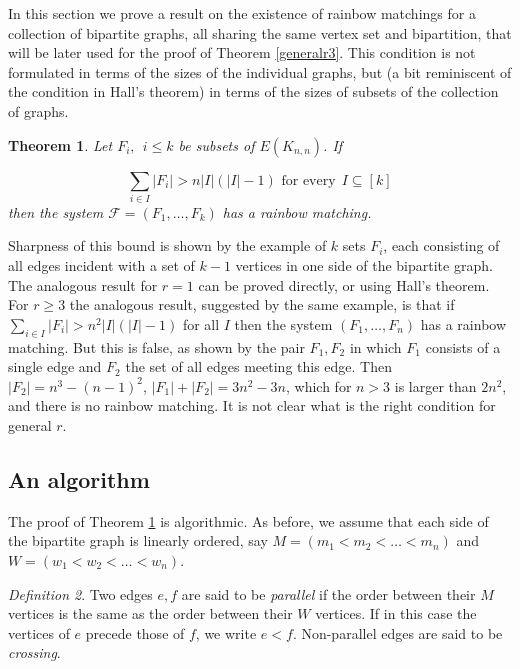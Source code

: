 \documentclass{amsart}
\newtheorem{theorem}{Theorem}[section]
\theoremstyle{remark}
\newtheorem{definition}[theorem]{Definition}
\newcommand{\cf}{\mathcal F}
\begin{document}
In this section we prove a result on the existence of rainbow
matchings for a collection of bipartite graphs, all sharing the same
vertex set and bipartition, that will be later used for the proof of
Theorem \ref{generalr3}. This condition is not formulated in terms
of the sizes of the individual graphs, but (a bit reminiscent of the
condition in Hall's theorem) in terms of the sizes of subsets of the
collection of graphs.

\begin{theorem}\label{maintheorem}
Let  $F_i,~~i \le k$ be subsets of $E(K_{n,n})$.
 If

 \begin{equation}\label{condition}
 \sum_{i \in I}|F_i| > n|I|(|I|-1) \mbox{ for every} ~~I \subseteq [k]
 \end{equation}
 then the system $\cf=(F_1, \ldots ,F_k)$ has  a rainbow matching.
  \end{theorem}


Sharpness of this bound is shown by the example of $k$ sets $F_i$,
 each consisting of all edges incident with a set  of $k-1$ vertices in one side of the bipartite graph.
The analogous result for $r=1$ can be proved directly, or using
Hall's theorem. For $r \ge 3$ the analogous result,
suggested by the same example, is that if
$\sum_{i \in I}|F_i| > n^2|I|(|I|-1)$ for all $I$ then the system $(F_1, \ldots ,F_n)$ has a
rainbow matching. But this is false, as shown by the pair $F_1, F_2$ in
which $F_1$ consists of a single edge and $F_2$ the set of all edges meeting this edge.
Then $|F_2|=n^3-(n-1)^2$, $|F_1|+|F_2|=3n^2-3n$, which for $n>3$ is larger than $2n^2$, and there is no rainbow matching.
It is not clear what is the right condition for general $r$.











\subsection{ An algorithm}

The proof of Theorem \ref{maintheorem} is algorithmic. As before, we
assume that each side of the bipartite graph is linearly ordered,
say $M=(m_1 <m_2 <
 \ldots< m_n)$ and $W=(w_1 <w_2<  \ldots < w_n)$.


 \begin{definition}\label{crossing} Two edges $e,f$ are said to be {\em parallel} if the order between their $M$ vertices is the same as the order between their $W$ vertices. If in this case the vertices of $e$ precede those of $f$, we write $e<f$. Non-parallel edges are said to be {\em crossing}.
 \end{definition}
\end{document}
